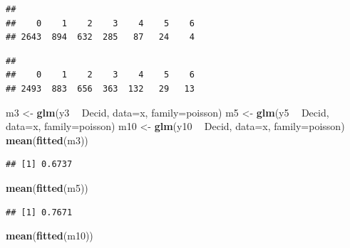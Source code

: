 \documentclass[12pt,]{book}
\newenvironment{Shaded}{\begin{snugshade}}{\end{snugshade}}
\newcommand{\DataTypeTok}[1]{\textcolor[rgb]{0.13,0.29,0.53}{#1}}
\newcommand{\KeywordTok}[1]{\textcolor[rgb]{0.13,0.29,0.53}{\textbf{#1}}}
\newcommand{\NormalTok}[1]{#1}
\newcommand{\OperatorTok}[1]{\textcolor[rgb]{0.81,0.36,0.00}{\textbf{#1}}}
\newcommand{\StringTok}[1]{\textcolor[rgb]{0.31,0.60,0.02}{#1}}
\begin{document}
\begin{verbatim}
## 
##    0    1    2    3    4    5    6 
## 2643  894  632  285   87   24    4
\end{verbatim}

\begin{Shaded}
\end{Shaded}

\begin{verbatim}
## 
##    0    1    2    3    4    5    6 
## 2493  883  656  363  132   29   13
\end{verbatim}

\begin{Shaded}
\begin{Highlighting}[]
\NormalTok{m3 <-}\StringTok{ }\KeywordTok{glm}\NormalTok{(y3 }\OperatorTok{~}\StringTok{ }\NormalTok{Decid, }\DataTypeTok{data=}\NormalTok{x, }\DataTypeTok{family=}\NormalTok{poisson)}
\NormalTok{m5 <-}\StringTok{ }\KeywordTok{glm}\NormalTok{(y5 }\OperatorTok{~}\StringTok{ }\NormalTok{Decid, }\DataTypeTok{data=}\NormalTok{x, }\DataTypeTok{family=}\NormalTok{poisson)}
\NormalTok{m10 <-}\StringTok{ }\KeywordTok{glm}\NormalTok{(y10 }\OperatorTok{~}\StringTok{ }\NormalTok{Decid, }\DataTypeTok{data=}\NormalTok{x, }\DataTypeTok{family=}\NormalTok{poisson)}
\KeywordTok{mean}\NormalTok{(}\KeywordTok{fitted}\NormalTok{(m3))}
\end{Highlighting}
\end{Shaded}

\begin{verbatim}
## [1] 0.6737
\end{verbatim}

\begin{Shaded}
\begin{Highlighting}[]
\KeywordTok{mean}\NormalTok{(}\KeywordTok{fitted}\NormalTok{(m5))}
\end{Highlighting}
\end{Shaded}

\begin{verbatim}
## [1] 0.7671
\end{verbatim}

\begin{Shaded}
\begin{Highlighting}[]
\KeywordTok{mean}\NormalTok{(}\KeywordTok{fitted}\NormalTok{(m10))}
\end{Highlighting}
\end{Shaded}
\end{document}
